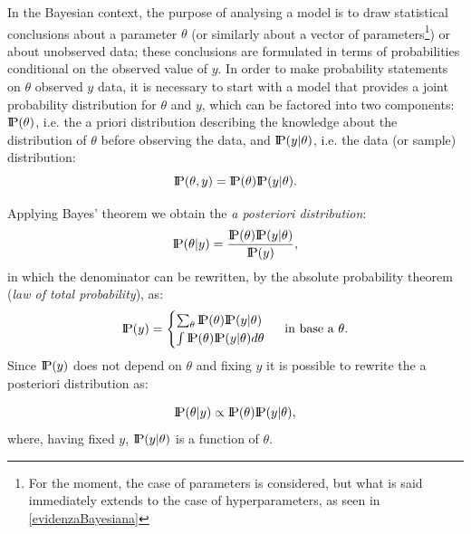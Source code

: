 \vspace{0.5cm}

In the Bayesian context, the purpose of analysing a model is to draw statistical conclusions about a parameter $\theta$ (or similarly about a vector of parameters\footnote{For the moment, the case of parameters is considered, but what is said immediately extends to the case of hyperparameters, as seen in \ref{evidenzaBayesiana}}) or about unobserved data; these conclusions are formulated in terms of probabilities conditional on the observed value of $y$. 
In order to make probability statements on $\theta$ observed $y$ data, it is necessary to start with a model that provides a joint probability distribution for $\theta$ and $y$, which can be factored into two components: $\text{I\kern-0.18em P}(\theta)$, i.e. the a priori distribution describing the knowledge about the distribution of $\theta$ before observing the data, and $\text{I\kern-0.18em P}(y|\theta)$, i.e. the data (or sample) distribution:
\[
\text{I\kern-0.18em P}(\theta, y)=\text{I\kern-0.18em P}(\theta)\text{I\kern-0.18em P}(y|\theta).
\]

Applying Bayes' theorem we obtain the \textit{a posteriori distribution}:
\[
\text{I\kern-0.18em P}(\theta | y)=\frac{\text{I\kern-0.18em P}(\theta)\text{I\kern-0.18em P}(y|\theta)}{\text{I\kern-0.18em P}(y)},
\]
in which the denominator can be rewritten, by the absolute probability theorem (\textit{law of total probability}), as:
\[
\text{I\kern-0.18em P}(y)=\begin{cases}\sum_\theta \text{I\kern-0.18em P}(\theta)\text{I\kern-0.18em P}(y| \theta)\\\int\text{I\kern-0.18em P}(\theta)\text{I\kern-0.18em P}(y| \theta)d\theta \end{cases} \text{ in base a }\theta.
\]
Since $\text{I\kern-0.18em P}(y)$ does not depend on $\theta$ and fixing $y$ it is possible to rewrite the a posteriori distribution as:

\[
\text{I\kern-0.18em P}(\theta | y)\propto \text{I\kern-0.18em P}(\theta)\text{I\kern-0.18em P}(y|\theta),
\]
where, having fixed $y$, $\text{I\kern-0.18em P}(y|\theta)$ is a function of $\theta$.

\newpage

